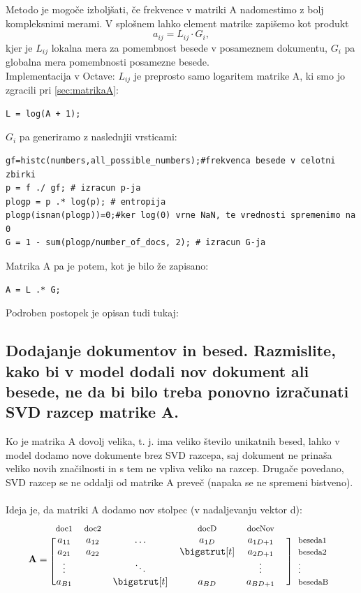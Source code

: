 \documentclass{article}
\begin{document}
Metodo je mogoče izboljšati, če frekvence v matriki A nadomestimo z bolj kompleksnimi merami. V splošnem lahko element matrike zapišemo kot produkt
\[ a_{ij} = L_{ij} \cdot G_{i}, \]
 kjer je \(L_{ij} \) lokalna mera za pomembnost besede v posameznem dokumentu, \(G_{i} \) pa globalna mera pomembnosti posamezne besede. \\

Implementacija v Octave:
 \(L_{ij} \) je preprosto samo logaritem matrike A, ki smo jo zgracili pri \ref{sec:matrikaA}:
\begin{lstlisting}
L = log(A + 1);
\end{lstlisting}
\(G_{i} \)  pa generiramo z naslednjii vrsticami:
\begin{lstlisting}
gf=histc(numbers,all_possible_numbers);#frekvenca besede v celotni zbirki
p = f ./ gf; # izracun p-ja
plogp = p .* log(p); # entropija
plogp(isnan(plogp))=0;#ker log(0) vrne NaN, te vrednosti spremenimo na 0
G = 1 - sum(plogp/number_of_docs, 2); # izracun G-ja
\end{lstlisting}
Matrika A pa je potem, kot je bilo že zapisano:
\begin{lstlisting}
A = L .* G;
\end{lstlisting}
Podroben postopek je opisan tudi tukaj: \cite{dumais}

\subsection{Dodajanje dokumentov in besed. Razmislite, kako bi v model dodali nov dokument ali besede, ne da bi bilo treba ponovno izračunati SVD razcep matrike A.}

Ko je matrika A dovolj velika, t. j. ima veliko število unikatnih besed, lahko v model dodamo nove dokumente brez SVD razcepa, saj dokument ne prinaša veliko novih značilnosti in s tem ne vpliva veliko na razcep. Drugače povedano, SVD razcep se ne oddalji od matrike A preveč (napaka se ne spremeni bistveno). \\ \\
Ideja je, da matriki A dodamo nov stolpec (v nadaljevanju vektor d):
\begin{equation*}
  \mathbf{A}=
  \begin{blockarray}{*{6}{c} l}
    \begin{block}{*{6}{>{$\footnotesize}c<{$}} l}
      doc1 & doc2 &  &  docD & docNov \\
    \end{block}
    \begin{block}{[*{6}{c}]>{$\footnotesize}l<{$}}
      a_{11}  & a_{12} & \dots           & a_{1D}       & a_{1D+1}  &  & beseda1 \\
       a_{21} & a_{22} &                    & \bigstrut[t] &  a_{2D+1} &  &  beseda2 \\
      \vdots   &             & \ddots         &                    &  \vdots       &  &   \vdots  \\
      a_{B1} &              &  \bigstrut[t] & a_{BD}       &  a_{BD+1} &  &  besedaB \\
    \end{block}
  \end{blockarray}
\end{equation*}
\end{document}
